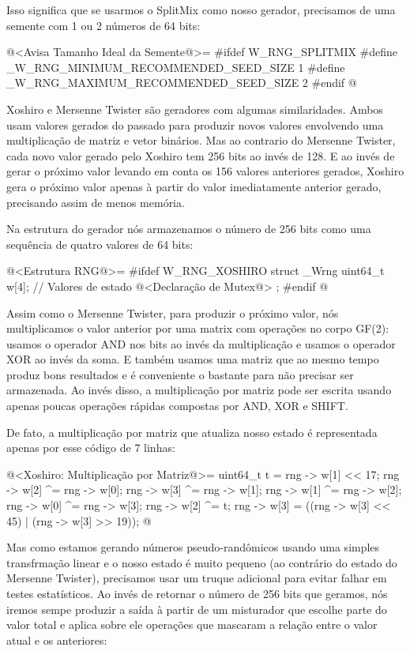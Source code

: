 Isso significa que se usarmos o SplitMix como nosso gerador,
precisamos de uma semente com 1 ou 2 números de 64 bits:

\iniciocodigo
@<Avisa Tamanho Ideal da Semente@>=
#ifdef W_RNG_SPLITMIX
#define _W_RNG_MINIMUM_RECOMMENDED_SEED_SIZE  1
#define _W_RNG_MAXIMUM_RECOMMENDED_SEED_SIZE  2
#endif
@
\fimcodigo



Xoshiro e Mersenne Twister são geradores com algumas
similaridades. Ambos usam valores gerados do passado para produzir
novos valores envolvendo uma multiplicação de matriz e vetor
binários. Mas ao contrario do Mersenne Twister, cada novo valor gerado
pelo Xoshiro tem 256 bits ao invés de 128. E ao invés de gerar o
próximo valor levando em conta os 156 valores anteriores gerados,
Xoshiro gera o próximo valor apenas à partir do valor imediatamente
anterior gerado, precisando assim de menos memória.

Na estrutura do gerador nós armazenamos o número de 256 bits como uma
sequência de quatro valores de 64 bits:

\iniciocodigo
@<Estrutura RNG@>=
#ifdef W_RNG_XOSHIRO
struct _Wrng{
  uint64_t w[4];   // Valores de estado
  @<Declaração de Mutex@>
};
#endif
@
\fimcodigo

Assim como o Mersenne Twister, para produzir o próximo valor, nós
multiplicamos o valor anterior por uma matrix com operações no corpo
GF(2): usamos o operador AND nos bits ao invés da multiplicação e
usamos o operador XOR ao invés da soma. E também usamos uma matriz que
ao mesmo tempo produz bons resultados e é conveniente o bastante para
não precisar ser armazenada. Ao invés disso, a multiplicação por
matriz pode ser escrita usando apenas poucas operações rápidas
compostas por AND, XOR e SHIFT.

De fato, a multiplicação por matriz que atualiza nosso estado é
representada apenas por esse código de 7 linhas:

\iniciocodigo
@<Xoshiro: Multiplicação por Matriz@>=
{
  uint64_t t = rng -> w[1] << 17;
  rng -> w[2] ^= rng -> w[0];
  rng -> w[3] ^= rng -> w[1];
  rng -> w[1] ^= rng -> w[2];
  rng -> w[0] ^= rng -> w[3];
  rng -> w[2] ^= t;
  rng -> w[3] = ((rng -> w[3] << 45) | (rng -> w[3] >> 19));
}
@
\fimcodigo

Mas como estamos gerando números pseudo-randômicos usando uma simples
transfrmação linear e o nosso estado é muito pequeno (ao contrário do
estado do Mersenne Twister), precisamos usar um truque adicional para
evitar falhar em testes estatísticos. Ao invés de retornar o número de
256 bits que geramos, nós iremos sempe produzir a saída à partir de um
misturador que escolhe parte do valor total e aplica sobre ele
operações que mascaram a relação entre o valor atual e os anteriores:


